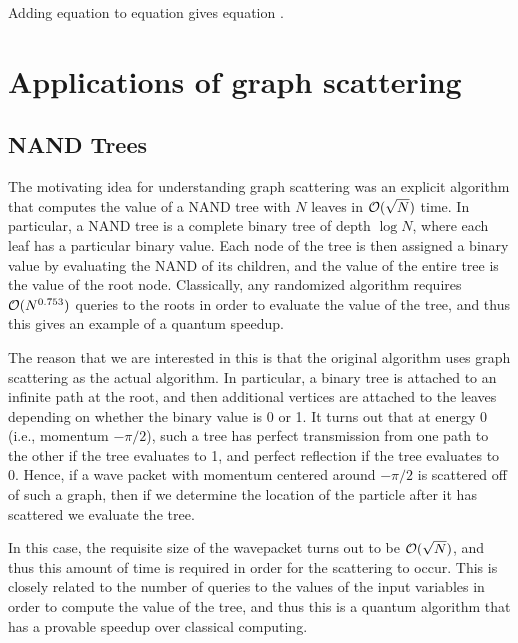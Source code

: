 \documentclass[../thesis-main/thesis-main]{subfiles}
\begin{document}
 Adding equation  to equation  gives
equation .


\section{Applications of graph scattering}

\subsection{NAND Trees}

The motivating idea for understanding graph scattering was an explicit algorithm that computes the value of a NAND tree with $N$ leaves in $\mathcal{O}(\sqrt{N})$ time.  In particular, a NAND tree is a complete binary tree of depth $\log N$, where each leaf has a particular binary value.  Each node of the tree is then assigned a binary value by evaluating the NAND of its children, and the value of the entire tree is the value of the root node.  Classically, any randomized algorithm requires $\mathcal{O}(N^{0.753})$ queries to the roots in order to evaluate the value of the tree, and thus this gives an example of a quantum speedup.

The reason that we are interested in this is that the original algorithm uses graph scattering as the actual algorithm.  In particular, a binary tree is attached to an infinite path at the root, and then additional vertices are attached to the leaves depending on whether the binary value is 0 or 1.  It turns out that at energy 0 (i.e., momentum $-\pi/2$), such a tree has perfect transmission from one path to the other if the tree evaluates to 1, and perfect reflection if the tree evaluates to 0.  Hence, if a wave packet with momentum centered around $-\pi/2$ is scattered off of such a graph, then if we determine the location of the particle after it has scattered we evaluate the tree. 

In this case, the requisite size of the wavepacket turns out to be $\mathcal{O}(\sqrt{N})$, and thus this amount of time is required in order for the scattering to occur.  This is closely related to the number of queries to the values of the input variables in order to compute the value of the tree, and thus this is a quantum algorithm that has a provable speedup over classical computing.
\end{document}
